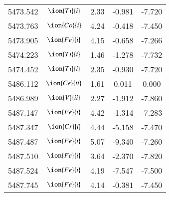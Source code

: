 \documentclass[fleqn,usenatbib]{mnras}
\begin{document}
\begin{center}
\begin{table}
\begin{tabular}{ccccc}
5473.542 &  $\ion{Ti}{i}$  & 2.33 & -0.981 & -7.720 \\ 
5473.763 &  $\ion{Co}{i}$  & 4.24 & -0.418 & -7.450 \\ 
5473.905 &  $\ion{Fe}{i}$  & 4.15 & -0.658 & -7.266 \\ 
5474.223 &  $\ion{Ti}{i}$  & 1.46 & -1.278 & -7.732 \\ 
5474.452 &  $\ion{Ti}{i}$  & 2.35 & -0.930 & -7.720 \\ 
5486.112 &  $\ion{Ce}{ii}$  & 1.61 & 0.011 & 0.000 \\ 
5486.989 &  $\ion{V}{ii}$  & 2.27 & -1.912 & -7.860 \\ 
5487.147 &  $\ion{Fe}{i}$  & 4.42 & -1.314 & -7.283 \\ 
5487.347 &  $\ion{Cr}{i}$  & 4.44 & -5.158 & -7.470 \\ 
5487.487 &  $\ion{Fe}{i}$  & 5.07 & -9.340 & -7.260 \\ 
5487.510 &  $\ion{Fe}{i}$  & 3.64 & -2.370 & -7.820 \\ 
5487.524 &  $\ion{Fe}{i}$  & 4.19 & -7.547 & -7.500 \\ 
5487.745 &  $\ion{Fe}{i}$  & 4.14 & -0.381 & -7.450 \\
 \end{tabular}
 \end{table}
 \end{center}
\end{document}
